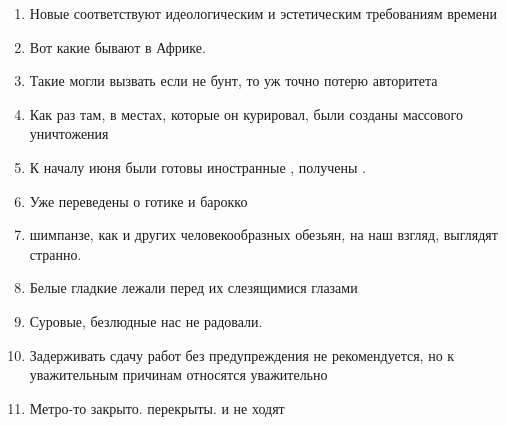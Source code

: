 \documentclass[paper=a4, fontsize=11pt]{scrartcl}
\begin{document}
\begin{enumerate}
    \item Новые \raisebox{-0.5cm}{\shortstack{\underline{\hspace{3cm}}\\talo}} соответствуют идеологическим и эстетическим требованиям времени
    \item Вот какие \raisebox{-0.5cm}{\shortstack{\underline{\hspace{3cm}}\\ihme}} бывают в Африке. 
    \item Такие \raisebox{-0.5cm}{\shortstack{\underline{\hspace{3cm}}\\keskustelu}}  могли вызвать если не бунт, то уж точно потерю авторитета
    \item Как раз там, в местах, которые он курировал, были созданы \raisebox{-0.5cm}{\shortstack{\underline{\hspace{3cm}}\\leiri}} массового уничтожения
    \item К началу июня были готовы иностранные \raisebox{-0.5cm}{\shortstack{\underline{\hspace{3cm}}\\passi}} , получены \raisebox{-0.5cm}{\shortstack{\underline{\hspace{3cm}}\\viisumi}} . 
    \item Уже переведены   о готике и барокко
    \item {} шимпанзе, как и других человекообразных обезьян, на наш взгляд, выглядят странно.
    \item Белые гладкие \raisebox{-0.5cm}{\shortstack{\underline{\hspace{3cm}}\\kukkula}}  лежали перед их слезящимися глазами
    \item  Суровые, безлюдные \raisebox{-0.5cm}{\shortstack{\underline{\hspace{3cm}}\\ranta}}  нас не радовали.
    \item Задерживать сдачу работ без предупреждения не рекомендуется, но к уважительным причинам \raisebox{-0.5cm}{\shortstack{\underline{\hspace{3cm}}\\professori}}  относятся уважительно
    \item Метро-то закрыто. \raisebox{-0.5cm}{\shortstack{\underline{\hspace{3cm}}\\silta}} перекрыты. \raisebox{-0.5cm}{\shortstack{\underline{\hspace{3cm}}\\juna}}  и \raisebox{-0.5cm}{\shortstack{\underline{\hspace{3cm}}\\bussi}}  не ходят
\end{enumerate}
\end{document}
